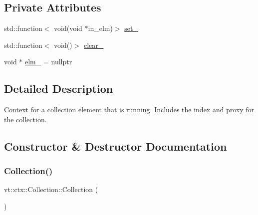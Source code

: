 \subsection*{Private Attributes}
\begin{DoxyCompactItemize}
\item 
std\+::function$<$ void(void $\ast$in\+\_\+elm)$>$ \hyperlink{structvt_1_1ctx_1_1_collection_a27570daa078b9d23412e5e397db9ab8b}{set\+\_\+}
\item 
std\+::function$<$ void()$>$ \hyperlink{structvt_1_1ctx_1_1_collection_a300d6fb22980dbd23b0cdb8737dc25be}{clear\+\_\+}
\item 
void $\ast$ \hyperlink{structvt_1_1ctx_1_1_collection_a74386b91e95eca571c746fbacada96ca}{elm\+\_\+} = nullptr
\end{DoxyCompactItemize}


\subsection{Detailed Description}
\hyperlink{structvt_1_1ctx_1_1_context}{Context} for a collection element that is running. Includes the index and proxy for the collection. 

\subsection{Constructor \& Destructor Documentation}
\mbox{\label{structvt_1_1ctx_1_1_collection_a19c7871680086e92be70f24d58bb0321}} 
\subsubsection{\texorpdfstring{Collection()}{Collection()}\hspace{0.1cm}{\footnotesize\ttfamily [1/2]}}
{\footnotesize\ttfamily vt\+::ctx\+::\+Collection\+::\+Collection (\begin{DoxyParamCaption}{ }\end{DoxyParamCaption})\hspace{0.3cm}{\ttfamily [default]}}

\mbox{\label{structvt_1_1ctx_1_1_collection_a461f8690260111c0dd2f21bd1b3acf6c}} 
